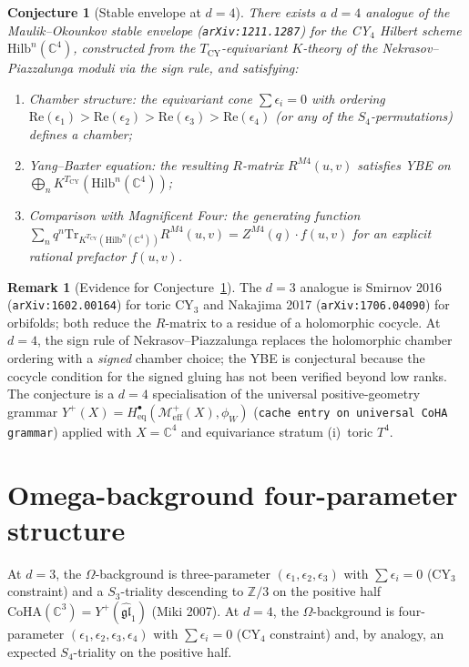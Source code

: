 \documentclass[11pt]{article}
\providecommand{\C}{\mathbb{C}}
\providecommand{\Z}{\mathbb{Z}}
\providecommand{\fgl}{\mathfrak{gl}}
\providecommand{\cM}{\mathcal{M}}
\providecommand{\Hilb}{\mathrm{Hilb}}
\providecommand{\Tr}{\mathrm{Tr}}
\newtheorem{conjecture}[theorem]{Conjecture}
\theoremstyle{definition}
\newtheorem{remark}[theorem]{Remark}
\begin{document}
\begin{conjecture}[Stable envelope at $d = 4$]
\label{conj:mo-envelope-d4}
There exists a $d = 4$ analogue of the Maulik--Okounkov stable envelope
(\texttt{arXiv:1211.1287}) for the CY$_4$ Hilbert scheme
$\Hilb^n(\C^4)$, constructed from the $T_{\mathrm{CY}}$-equivariant
$K$-theory of the Nekrasov--Piazzalunga moduli via the
sign rule, and satisfying:
\begin{enumerate}[label=(\roman*)]
  \item \emph{Chamber structure}: the equivariant cone
  $\sum \epsilon_i = 0$ with ordering
  $\mathrm{Re}(\epsilon_1) > \mathrm{Re}(\epsilon_2) > \mathrm{Re}(\epsilon_3) > \mathrm{Re}(\epsilon_4)$
  (or any of the $S_4$-permutations) defines a chamber;
  \item \emph{Yang--Baxter equation}: the resulting $R$-matrix
  $R^{M4}(u, v)$ satisfies YBE on
  $\bigoplus_n K^{T_{\mathrm{CY}}}(\Hilb^n(\C^4))$;
  \item \emph{Comparison with Magnificent Four}: the generating function
  $\sum_n q^n \Tr_{K^{T_{\mathrm{CY}}}(\Hilb^n(\C^4))} R^{M4}(u, v)
  = Z^{M4}(q) \cdot f(u, v)$ for an explicit rational prefactor
  $f(u, v)$.
\end{enumerate}
\end{conjecture}

\begin{remark}[Evidence for Conjecture~\ref{conj:mo-envelope-d4}]
\label{rem:mo-d4-evidence}
The $d = 3$ analogue is Smirnov 2016 (\texttt{arXiv:1602.00164}) for
toric CY$_3$ and Nakajima 2017 (\texttt{arXiv:1706.04090}) for
orbifolds; both reduce the $R$-matrix to a residue of a holomorphic
cocycle. At $d = 4$, the sign rule of Nekrasov--Piazzalunga replaces
the holomorphic chamber ordering with a \emph{signed} chamber choice;
the YBE is conjectural because the cocycle condition for the signed
gluing has not been verified beyond low ranks.
The conjecture is a $d = 4$ specialisation of the universal
positive-geometry grammar
$Y^+(X) = H^\bullet_{\mathrm{eq}}(\cM^+_{\mathrm{eff}}(X), \phi_W)$
(\texttt{cache entry on universal CoHA grammar}) applied with
$X = \C^4$ and equivariance stratum (i)~toric $T^4$.
\end{remark}

\section{Omega-background four-parameter structure}
\label{sec:omega-bg}

At $d = 3$, the $\Omega$-background is three-parameter
$(\epsilon_1, \epsilon_2, \epsilon_3)$ with $\sum \epsilon_i = 0$
(CY$_3$ constraint) and a $S_3$-triality descending to $\Z/3$ on the
positive half $\mathrm{CoHA}(\C^3) = Y^+(\widehat{\fgl}_1)$
(Miki 2007). At $d = 4$, the $\Omega$-background is four-parameter
$(\epsilon_1, \epsilon_2, \epsilon_3, \epsilon_4)$ with
$\sum \epsilon_i = 0$ (CY$_4$ constraint) and, by analogy, an
expected $S_4$-triality on the positive half.
\end{document}
